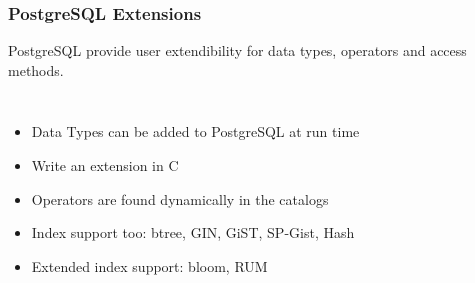\documentclass[xcolor=dvipsnames]{beamer}
\begin{document}
{
 
  \begin{frame}
    \frametitle{PostgreSQL Extensions}

    PostgreSQL provide user extendibility for data types, operators and
    access methods.

    \vfill

    \begin{columns}[c]
      \begin{itemize}
      \item Data Types can be added to PostgreSQL at run time
      \item Write an extension in C
      \item Operators are found dynamically in the catalogs
      \item Index support too: btree, GIN, GiST, SP-Gist, Hash
      \item Extended index support: bloom, RUM
      \end{itemize}
    \end{columns}    
  \end{frame}
}
\end{document}
